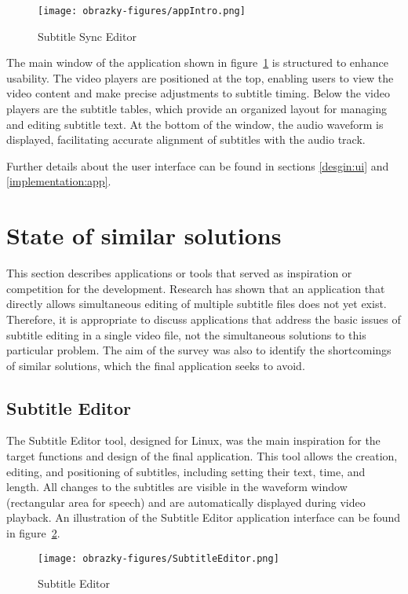 \begin{figure}[h]
    \centering
    \texttt{[image: obrazky-figures/appIntro.png]}
    \caption{Subtitle Sync Editor}
    \label{fig:appIntro}
\end{figure}

The main window of the application shown in figure~\ref{fig:appIntro} is structured to enhance usability. The video players are positioned at the top, enabling users to view the video content and make precise adjustments to subtitle timing. Below the video players are the subtitle tables, which provide an organized layout for managing and editing subtitle text. At the bottom of the window, the audio waveform is displayed, facilitating accurate alignment of subtitles with the audio track.

Further details about the user interface can be found in sections \ref{desgin:ui} and \ref{implementation:app}.

\section{State of similar solutions}

This section describes applications or tools that served as inspiration or competition for the development. Research has shown that an application that directly allows simultaneous editing of multiple subtitle files does not yet exist. Therefore, it is appropriate to discuss applications that address the basic issues of subtitle editing in a single video file, not the simultaneous solutions to this particular problem. The aim of the survey was also to identify the shortcomings of similar solutions, which the final application seeks to avoid.

\subsection{Subtitle Editor}

The Subtitle Editor tool, designed for Linux, was the main inspiration for the target functions and design of the final application. This tool allows the creation, editing, and positioning of subtitles, including setting their text, time, and length. All changes to the subtitles are visible in the waveform window (rectangular area for speech) and are automatically displayed during video playback. An illustration of the Subtitle Editor application interface can be found in figure~\ref{fig:SubtitleEditor}.

\begin{figure}[ht]
    \centering
    \texttt{[image: obrazky-figures/SubtitleEditor.png]}
    \caption{Subtitle Editor}
    \label{fig:SubtitleEditor}
\end{figure}

